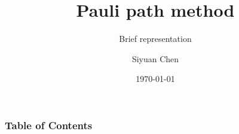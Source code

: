 \documentclass{beamer}
\title[Noisy circuit simulation]
{Pauli path method}
\subtitle{Brief representation}
\author[Siyuan Chen] %
{Siyuan Chen\inst{1}}
\date[Representation] %
{\today}
\begin{document}

\frame{\titlepage}

\begin{frame}
\frametitle{Table of Contents}
\tableofcontents
\end{frame}









\end{document}
